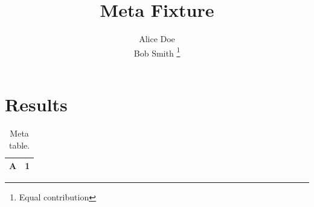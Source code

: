 \documentclass{article}
\title{Meta Fixture}
\author{
  Alice Doe

  Bob Smith
  \thanks{Equal contribution}
}
\date{}
\begin{document}
\section{Results}
\begin{table}
\centering
\caption{Meta table.}
\label{tab:meta}
\begin{tabular}{lc}
\toprule
A & 1 \\
\bottomrule
\end{tabular}
\end{table}
\end{document}
